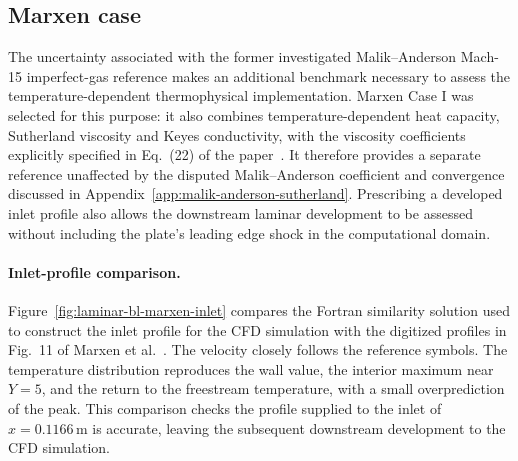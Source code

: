 \clearpage
\subsection{Marxen case}
\label{subsec:laminar-bl-marxen}

The uncertainty associated with the former investigated Malik--Anderson Mach-15 imperfect-gas reference makes an additional benchmark necessary to assess the temperature-dependent
thermophysical implementation. Marxen Case I was selected for this purpose:
it also combines temperature-dependent heat capacity, Sutherland viscosity
and Keyes conductivity, with the viscosity coefficients explicitly
specified in Eq.~(22) of the paper~\citep{Marxen2011HighOrder}.
It therefore provides a separate reference unaffected by the disputed
Malik--Anderson coefficient and convergence discussed in
Appendix~\ref{app:malik-anderson-sutherland}. Prescribing a developed
inlet profile also allows the downstream laminar development to be assessed
without including the plate's leading edge shock in the computational domain.

\paragraph{Inlet-profile comparison.}
Figure~\ref{fig:laminar-bl-marxen-inlet} compares the Fortran similarity
solution used to construct the inlet profile for the CFD simulation with the digitized profiles in
Fig.~11 of Marxen et al.~\citep{Marxen2011HighOrder}. The velocity closely
follows the reference symbols. The temperature distribution reproduces the
wall value, the interior maximum near \(Y=5\), and the return to the
freestream temperature, with a small overprediction of the peak.
This comparison checks the profile supplied to the inlet of \(x=0.1166\,\mathrm{m}\) is accurate, leaving the subsequent downstream development to the CFD simulation.

